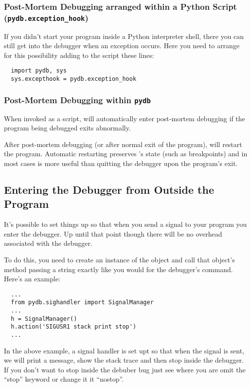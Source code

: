 \subsubsection{Post-Mortem Debugging arranged within a Python Script
  ({\tt pydb.exception_hook})}

If you didn't start your program inside a Python interpreter shell,
there you can still get into the debugger when an exception
occurs. Here you need to arrange for this possibility adding to the
script these lines:

\begin{verbatim}
  import pydb, sys
  sys.excepthook = pydb.exception_hook
\end{verbatim}

\subsubsection{Post-Mortem Debugging within {\tt pydb}}
When invoked as a script,  will automatically enter
post-mortem debugging if the program being debugged exits
abnormally. 

After post-mortem debugging (or after normal exit of the
program),  will restart the program.  Automatic restarting
preserves 's state (such as breakpoints) and in most cases
is more useful than quitting the debugger upon the program's exit.

\subsection{Entering the Debugger from Outside the Program}
It's possible to set things up so that when you send a signal to your
program you enter the debugger. Up until that point though there will
be no overhead associated with the debugger.

To do this, you need to create an instance of the
 object and call that object's 
method passing a string exactly like you would for the 
debugger's  command. Here's an example:

\begin{verbatim}
  ...
  from pydb.sighandler import SignalManager
  ...
  h = SignalManager()
  h.action('SIGUSR1 stack print stop')
  ...

\end{verbatim}

In the above example, a signal handler is set upt so that when the
 signal is sent, we will print a message, show the stack
trace and then stop inside the debugger. If you don't want to stop
inside the debuber bug just see where you are omit the ``stop''
keyword or change it it ``nostop''.

